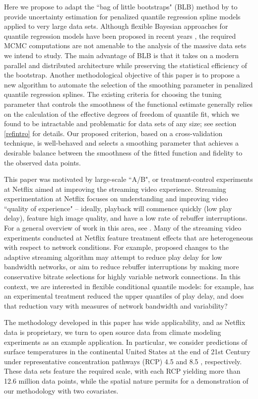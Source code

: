 \documentclass{statsoc}
\begin{document}
Here we propose to adapt the ``bag of little bootstraps" (BLB) method by \citet{kleiner2014scalable} to provide uncertainty estimation for penalized quantile regression spline models applied to very large data sets. Although flexible Bayesian approaches for quantile regression models have been proposed in recent years \citep{Reich2010,Yang2012}, the required MCMC computations are not amenable to the analysis of the massive data sets we intend to study. The main advantage of BLB is that it takes on a modern parallel and distributed architecture while preserving the statistical efficiency of the bootstrap. Another methodological objective of this paper is to propose a new algorithm to automate the selection of the smoothing parameter in penalized quantile regression splines. The existing criteria for choosing the tuning parameter that controls the smoothness of the functional estimate generally relies on the calculation of the effective degrees of freedom of quantile fit, which we found to be intractable and problematic for data sets of any size; see section \ref{refintro} for details. Our proposed criterion, based on a cross-validation technique, is well-behaved and selects a smoothing parameter that achieves a desirable balance between the smoothness of the fitted function and fidelity to the observed data points.

This paper was motivated by large-scale ``A/B", or treatment-control experiments at Netflix aimed at improving the streaming video experience. Streaming experimentation at Netflix focuses on understanding and improving video ``quality of experience" -- ideally, playback will commence quickly (low play delay), feature high image quality, and have a low rate of rebuffer interruptions. For a general overview of work in this area, see \citet{govind2014optimizing, govind2017A/B}. Many of the streaming video experiments conducted at Netflix feature treatment effects that are heterogeneous with respect to network conditions. For example, proposed changes to the adaptive streaming algorithm may attempt to reduce play delay for low bandwidth networks, or aim to reduce rebuffer interruptions by making more conservative bitrate selections for highly variable network connections. In this context, we are interested in flexible conditional quantile models: for example, has an experimental treatment reduced the upper quantiles of play delay, and does that reduction vary with measures of network bandwidth and variability? 

The methodology developed in this paper has wide applicability, and as Netflix data is proprietary, we turn to open source data from climate modeling experiments as an example application. In particular, we consider predictions of surface temperatures in the continental United States at the end of 21st Century under representative concentration pathways (RCP) 4.5 and 8.5 \citep{van2011representative}, respectively. These data sets feature the required scale, with each RCP yielding more than 12.6 million   {data points}, while the spatial nature permits for a demonstration of our methodology with two covariates. 
\end{document}

